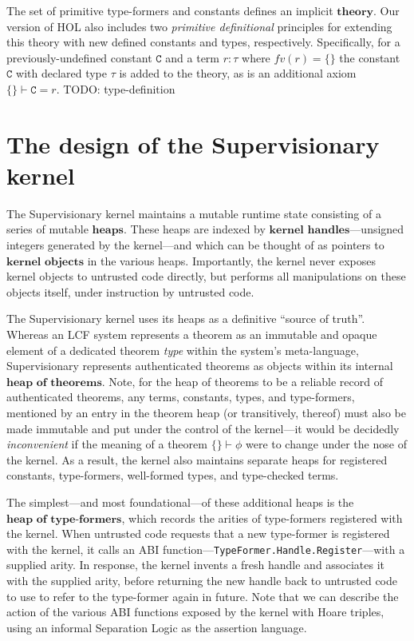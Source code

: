 \documentclass[a4paper, 10pt]{article}
\newcommand{\deffont}[1]{\ensuremath{\textbf{#1}}}
\begin{document}
The set of primitive type-formers and constants defines an implicit \deffont{theory}.
Our version of HOL also includes two \emph{primitive definitional} principles for extending this theory with new defined constants and types, respectively.
Specifically, for a previously-undefined constant $\mathtt{C}$ and a term $r : \tau$ where $fv(r) = \{\}$ the constant $\mathtt{C}$ with declared type $\tau$ is added to the theory, as is an additional axiom $\{\} \vdash \mathtt{C} = r$.
TODO: type-definition

\section{The design of the Supervisionary kernel}
\label{sect.design.supervisionary.kernel}

The Supervisionary kernel maintains a mutable runtime state consisting of a series of mutable \deffont{heaps}.
These heaps are indexed by \deffont{kernel handles}---unsigned integers generated by the kernel---and which can be thought of as pointers to \deffont{kernel objects} in the various heaps.
Importantly, the kernel never exposes kernel objects to untrusted code directly, but performs all manipulations on these objects itself, under instruction by untrusted code.

The Supervisionary kernel uses its heaps as a definitive ``source of truth''.
Whereas an LCF system represents a theorem as an immutable and opaque element of a dedicated theorem \emph{type} within the system's meta-language, Supervisionary represents authenticated theorems as objects within its internal \deffont{heap of theorems}.
Note, for the heap of theorems to be a reliable record of authenticated theorems, any terms, constants, types, and type-formers, mentioned by an entry in the theorem heap (or transitively, thereof) must also be made immutable and put under the control of the kernel---it would be decidedly \emph{inconvenient} if the meaning of a theorem $\{ \} \vdash \phi$ were to change under the nose of the kernel.
As a result, the kernel also maintains separate heaps for registered constants, type-formers, well-formed types, and type-checked terms.

The simplest---and most foundational---of these additional heaps is the \deffont{heap of type-formers}, which records the arities of type-formers registered with the kernel.
When untrusted code requests that a new type-former is registered with the kernel, it calls an ABI function---\texttt{TypeFormer.Handle.Register}---with a supplied arity.
In response, the kernel invents a fresh handle and associates it with the supplied arity, before returning the new handle back to untrusted code to use to refer to the type-former again in future.
Note that we can describe the action of the various ABI functions exposed by the kernel with Hoare triples, using an informal Separation Logic as the assertion language.
\end{document}

